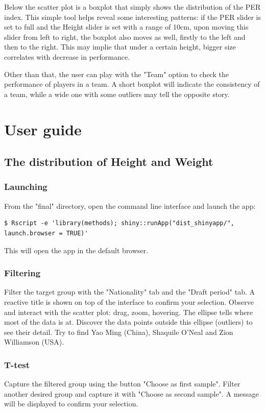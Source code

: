 \documentclass[a4paper,12pt,twoside]{article}
\numberwithin{equation}{section}
\begin{document}
Below the scatter plot is a boxplot that simply shows the distribution of the PER index. This simple tool helps reveal some interesting patterns: if the PER slider is set to full and the Height slider is set with a range of 10cm, upon moving this slider from left to right, the boxplot also moves as well, firstly to the left and then to the right. This may implie that under a certain height, bigger size correlates with decrease in performance.

Other than that, the user can play with the "Team" option to check the performance of players in a team. A short boxplot will indicate the consistency of a team, while a wide one with some outliers may tell the opposite story.

\section{User guide}
\subsection{The distribution of Height and Weight}

\subsubsection{Launching}
From the "final" directory, open the command line interface and launch the app:
\begin{lstlisting}
$ Rscript -e 'library(methods); shiny::runApp("dist_shinyapp/", launch.browser = TRUE)'
\end{lstlisting}
This will open the app in the default browser.
\subsubsection{Filtering}
Filter the target group with the "Nationality" tab and the "Draft period" tab. A reactive title is shown on top of the interface to confirm your selection. Observe and interact with the scatter plot: drag, zoom, hovering. The ellipse tells where most of the data is at. Discover the data points outside this ellipse (outliers) to see their detail. Try to find Yao Ming (China), Shaquile O'Neal and Zion Williamson (USA).
\subsubsection{T-test}
Capture the filtered group using the button "Choose as first sample". Filter another desired group and capture it with "Choose as second sample". A message will be displayed to confirm your selection.
\end{document}
